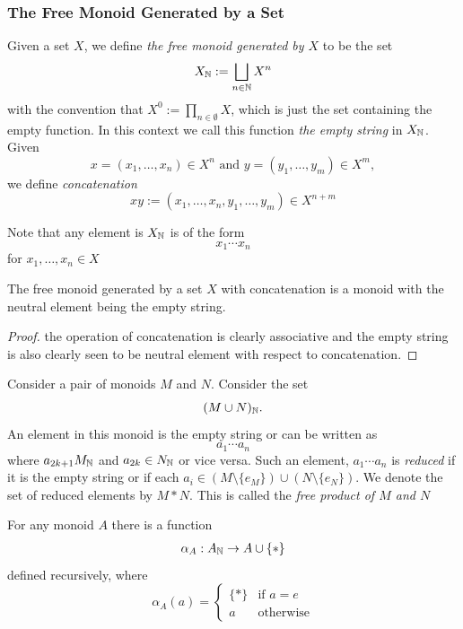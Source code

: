 \subsubsection{The Free Monoid Generated by a Set}
\begin{definition}
    Given a set $X$, we define \emph{the free monoid generated by $X$} to be the set
    $$
        X_{\mathbb{N}} := \bigsqcup_{n\in \mathbb{N}} X^n
    $$ 
    with the convention that $X^0 := \prod_{n\in \emptyset} X$, which is just the set containing the empty function. In this context we call this function \emph{the empty string} in $X_{\mathbb{N}}$. Given 
    $$
        x=(x_1,\dots,x_n)\in X^n \text{ and } y=(y_1,\dots,y_m)\in X^m,
    $$
    we define \emph{concatenation}
    $$
        xy := (x_1,\dots,x_n,y_1,\dots,y_m)\in X^{n+m}
    $$
\end{definition}
\begin{remark}
    Note that any element is $X_{\mathbb{N}}$ is of the form 
    $$
        x_1\cdots x_n
    $$
    for $x_1,\dots,x_n\in X$
\end{remark}
\begin{lemma}
    The free monoid generated by a set $X$ with concatenation is a monoid with the neutral element being the empty string.
\end{lemma}
\begin{proof}
    the operation of concatenation is clearly associative and the empty string is also clearly seen to be neutral element with respect to concatenation.
\end{proof}
\begin{definition}
    Consider a pair of monoids $M$ and $N$. Consider the set 
    $$
        (M\cup N)_{\mathbb{N}}.
    $$
    An element in this monoid is the empty string or can be written as 
    $$
        a_1\cdots a_n
    $$
    where $a_{2k+1} M_{\mathbb{N}}$ and $a_{2k}\in N_{\mathbb{N}}$ or vice versa. Such an element, $a_1\cdots a_n$ is \emph{reduced} if it is the empty string or if each $a_i\in (M\setminus\{e_M\})\cup (N\setminus\{e_N\})$. We denote the set of reduced elements by $M\ast N$. This is called the \emph{free product of $M$ and $N$}
\end{definition}
For any monoid $A$ there is a function
\begin{gather*}
    \alpha_A: A_{\mathbb{N}} \rightarrow A\cup\{\ast\}\\
\end{gather*}
defined recursively, where 
$$
    \alpha_A(a) = 
    \begin{cases}
        \{\ast\} & \text{if } a=e\\
        a & \text{otherwise}
    \end{cases}
$$
